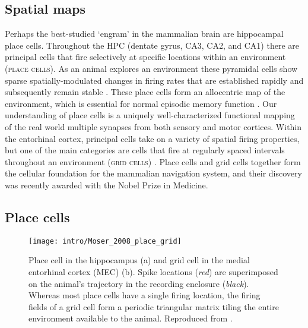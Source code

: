 \subsection{Spatial maps}
Perhaps the best-studied `engram' in the mammalian brain are hippocampal place cells.
Throughout the \ac{HPC} (dentate gyrus, CA3, CA2, and CA1) there are principal cells that fire selectively at specific locations within an environment (\textsc{place cells}).
As an animal explores an environment these pyramidal cells show sparse spatially-modulated changes in firing rates that are established rapidly and subsequently remain stable \citep{O'Keefe1971}\citep{Frank2004}.
These place cells form an allocentric map of the environment, which is essential for normal episodic memory function \citep{Smith2006c}\citep{Nakazawa2004}\citep{Buzsaki2013}.
Our understanding of place cells is a uniquely well-characterized functional mapping of the real world multiple synapses from both sensory and motor cortices.
Within the entorhinal cortex, principal cells take on a variety of spatial firing properties, but one of the main categories are cells that fire at regularly spaced intervals throughout an environment (\textsc{grid cells}) \citep{Hafting2005, Moser2014a}.
Place cells and grid cells together form the cellular foundation for the mammalian navigation system, and their discovery was recently awarded with the Nobel Prize in Medicine.

\subsection{Place cells}\label{sec:intro:memory:place_cells}
\begin{figure}
	\centering
	\texttt{[image: intro/Moser\_2008\_place\_grid]}
	\caption[Place cell in the hippocampus and grid cell in the MEC]{Place cell in the hippocampus (a) and grid cell in the medial entorhinal cortex (MEC) (b).
	Spike locations (\emph{red}) are superimposed on the animal’s trajectory in the recording enclosure (\emph{black}).
	Whereas most place cells have a single firing location, the firing fields of a grid cell form a periodic triangular matrix tiling the entire environment available to the animal.
	Reproduced from \citet{Moser2008}.}
	\label{fig:intro:memory:place_grid}
\end{figure}

